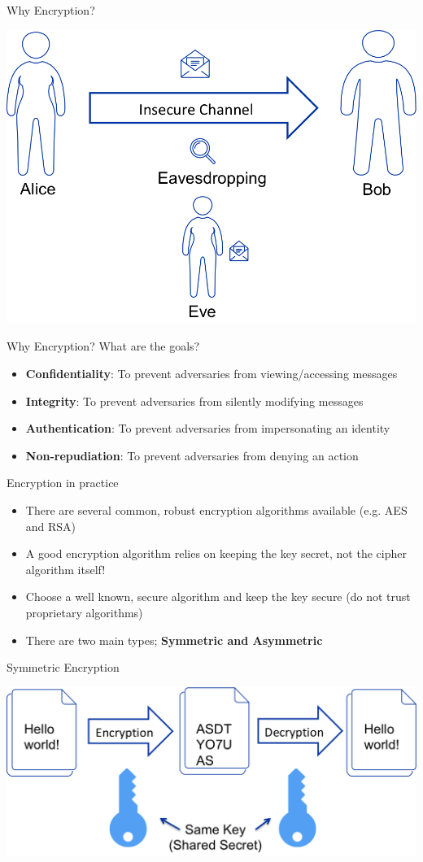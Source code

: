 \documentclass{beamer}
\begin{document}
\begin{frame}{Why Encryption?}
\begin{center}
	\includegraphics[width=0.7\linewidth]{insecure-channel.png}
\end{center}
\end{frame}

\begin{frame}{Why Encryption?}
What are the goals? 
\begin{itemize}
  \item \textbf{Confidentiality}: To prevent adversaries from viewing/accessing messages
  \item \textbf{Integrity}: To prevent adversaries from silently modifying messages
  \item \textbf{Authentication}: To prevent adversaries from impersonating an identity
  \item \textbf{Non-repudiation}: To prevent adversaries from denying an action
\end{itemize}
\end{frame}

\begin{frame}{Encryption in practice}
\begin{itemize}
\item There are several common, robust encryption algorithms available (e.g. AES and RSA) 
\item A good encryption algorithm relies on keeping the key secret, not the cipher algorithm itself!
\item Choose a well known, secure algorithm and keep the key secure (do not trust proprietary algorithms)
\item There are two main types; \textbf{Symmetric and Asymmetric} 
\end{itemize}
\end{frame}

\begin{frame}{Symmetric Encryption}
\begin{center}
\includegraphics[width=0.7\linewidth]{symmetric-encryption.png}
\end{center}
\end{frame}
\end{document}
